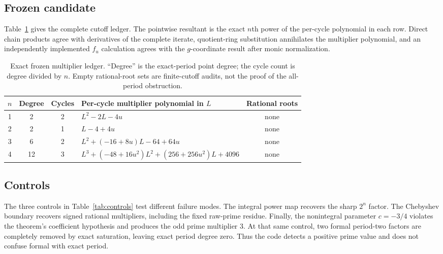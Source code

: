 \documentclass[11pt]{article}
\theoremstyle{remark}
\begin{document}
\subsection{Frozen candidate}

Table~\ref{tab:candidate-ledger} gives the complete cutoff ledger.  The
pointwise resultant is the exact \(n\)th power of the per-cycle polynomial in
each row.  Direct chain products agree with derivatives of the complete
iterate, quotient-ring substitution annihilates the multiplier polynomial,
and an independently implemented \(f_u\) calculation agrees with the
\(g\)-coordinate result after monic normalization.

\begin{table}[t]
\centering
\caption{Exact frozen multiplier ledger.  ``Degree'' is the exact-period
point degree; the cycle count is degree divided by \(n\).  Empty rational-root
sets are finite-cutoff audits, not the proof of the all-period obstruction.}
\label{tab:candidate-ledger}
\small
\begin{tabular}{@{}ccclc@{}}
\toprule
\(n\) & Degree & Cycles & Per-cycle multiplier polynomial in \(L\) &
Rational roots \\
\midrule
1 & 2  & 2 & \(L^2-2L-4u\) & none \\
2 & 2  & 1 & \(L-4+4u\) & none \\
3 & 6  & 2 & \(L^2+(-16+8u)L-64+64u\) & none \\
4 & 12 & 3 & \(L^3+(-48+16u^2)L^2+(256+256u^2)L+4096\) & none \\
\bottomrule
\end{tabular}
\end{table}

\subsection{Controls}

The three controls in Table~\ref{tab:controls} test different failure modes.
The integral power map recovers the sharp \(2^n\) factor.  The Chebyshev
boundary recovers signed rational multipliers, including the fixed raw-prime
residue.  Finally, the nonintegral parameter \(c=-3/4\) violates the theorem's
coefficient hypothesis and produces the odd prime multiplier \(3\).  At that
same control, two formal period-two factors are completely removed by exact
saturation, leaving exact period degree zero.  Thus the code detects a
positive prime value and does not confuse formal with exact period.
\end{document}
